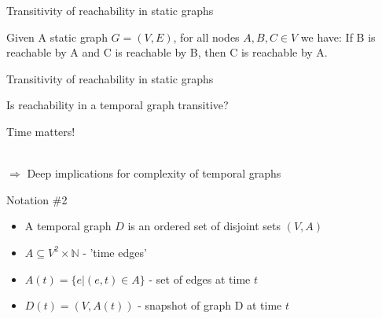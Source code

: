 \documentclass{beamer}
\begin{document}
\begin{frame}{Transitivity of reachability in static graphs}
		\begin{tcolorbox}[title=Reachability in a static graph is transitive]
      Given A static graph $G = (V, E)$, for all nodes $A, B, C \in V$ we have:
      If B is reachable by A and C is reachable by B, then C is reachable by A. \\
      \begin{center}
     \end{center}
		\end{tcolorbox}
\end{frame}

\begin{frame}{Transitivity of reachability in static graphs}
  \begin{center}
    \large
    Is reachability in a temporal graph transitive?
  \end{center}
\end{frame}

\begin{frame}{Time matters!}
   \\[5ex]
  $\Longrightarrow$ Deep implications for complexity of temporal graphs
\end{frame}

\begin{frame}{Notation \#2}
\begin{itemize}
	\item A temporal graph $D$ is an ordered set of disjoint sets $(V, A)$
	\item $A \subseteq V^2 \times \mathbb{N}$ - 'time edges'
	\item $A(t) = \{e | (e, t) \in A\}$ - set of edges at time $t$
	\item $D(t) = (V, A(t))$ - snapshot of graph D at time $t$
\end{itemize}
\end{frame}
\end{document}
